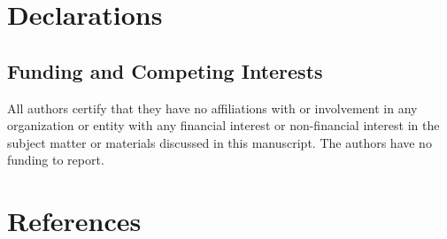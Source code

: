 \documentclass[
  letterpaper,
  DIV=11,
  numbers=noendperiod]{scrartcl}
\begin{document}
\section*{Declarations}\label{declarations}

\subsection*{Funding and Competing
Interests}\label{funding-and-competing-interests}

All authors certify that they have no affiliations with or involvement
in any organization or entity with any financial interest or
non-financial interest in the subject matter or materials discussed in
this manuscript. The authors have no funding to report.

\section*{References}\label{references}
\end{document}
